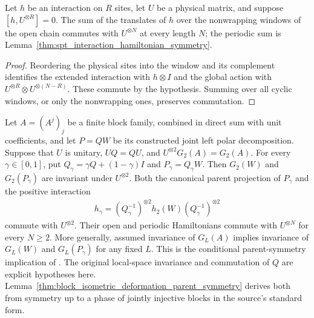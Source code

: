 \begin{lemma}
    \label{thm:parent_interaction_sum_on_site_symmetry}
    \leanok
    Let $h$ be an interaction on $R$ sites, let $U$ be a physical
    matrix, and suppose $[h,U^{\otimes R}]=0$. The sum of the translates
    of $h$ over the nonwrapping windows of the open chain commutes with
    $U^{\otimes N}$ at every length $N$; the periodic sum is
    Lemma~\ref{thm:spt_interaction_hamiltonian_symmetry}.
\end{lemma}

\begin{proof}
    \leanok
    Reordering the physical sites into the window and its complement
    identifies the extended interaction with $h\otimes I$ and the
    global action with $U^{\otimes R}\otimes U^{\otimes(N-R)}$.
    These commute by the hypothesis. Summing over all cyclic windows,
    or only the nonwrapping ones, preserves commutation.
\end{proof}

\begin{lemma}
    \label{thm:isometric_deformation_supplied_parent_symmetry}
    \leanok
    Let $A=(A^j)_j$ be a finite block family, combined in direct sum with unit
    coefficients, and let $P=QW$ be its constructed joint left polar
    decomposition. Suppose that $U$ is unitary, $UQ=QU$, and
    $U^{\otimes2}G_2(A)=G_2(A)$. For every $\gamma\in[0,1]$, put
    $Q_\gamma=\gamma Q+(1-\gamma)I$ and $P_\gamma=Q_\gamma W$.
    Then $G_2(W)$ and $G_2(P_\gamma)$ are invariant under
    $U^{\otimes2}$. Both the canonical parent projection of $P_\gamma$
    and the positive interaction
    \begin{align*}
        h_\gamma=(Q_\gamma^{-1})^{\otimes2}
        h_2(W)(Q_\gamma^{-1})^{\otimes2}
    \end{align*}
    commute with $U^{\otimes2}$. Their open and periodic Hamiltonians
    commute with $U^{\otimes N}$ for every $N\geq2$.
    More generally, assumed invariance of $G_L(A)$ implies invariance
    of $G_L(W)$ and $G_L(P_\gamma)$ for any fixed $L$.
    This is the conditional parent-symmetry implication of
    \cite[lines~672--676]{Schuch2011Phases}. The original local-space
    invariance and commutation of $Q$ are explicit hypotheses here.
    Lemma~\ref{thm:block_isometric_deformation_parent_symmetry} derives
    both from symmetry up to a phase of jointly injective blocks in the
    source's standard form.
\end{lemma}


